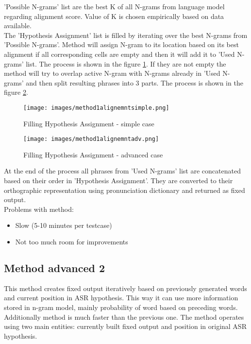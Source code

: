 \documentclass[a4paper,11pt,twoside]{report}
\theoremstyle{definition}
\begin{document}
'Possible N-grams' list are the best K of all N-grams from language model regarding alignment score. Value of K is chosen empirically based on data available.\\
The 'Hypothesis Assignment' list is filled by iterating over the best N-grams from 'Possible N-grams'. Method will assign N-gram to its location based on its best alignment if all corresponding cells are empty and then it will add it to 'Used N-grams' list. The process is shown in the figure \ref{img:method1alignemntsimple}. If they are not empty the method will try to overlap active N-gram with N-grams already in 'Used N-grams' and then split resulting phrases into 3 parts. The process is shown in the figure \ref{img:method1alignemntadv}.

\begin{figure}[H]{}
    \centering
    \texttt{[image: images/method1alignemntsimple.png]}
    \caption{Filling Hypothesis Assignment - simple case}
    \label{img:method1alignemntsimple}
\end{figure}

\begin{figure}[H]{}
    \centering
    \texttt{[image: images/method1alignemntadv.png]}
    \caption{Filling Hypothesis Assignment - advanced case}
    \label{img:method1alignemntadv}
\end{figure}

At the end of the process all phrases from 'Used N-grams' list are concatenated based on their order in 'Hypothesis Assignment'. They are converted to their orthographic representation using pronunciation dictionary and returned as fixed output.\\

Problems with method:
\begin{itemize}
    \item Slow (5-10 minutes per testcase)
    \item Not too much room for improvements
\end{itemize}

\subsection{Method advanced 2} \label{sec:met2}

This method creates fixed output iteratively based on previously generated words and current position in ASR hypothesis. This way it can use more information stored in n-gram model, mainly probability of word based on preceding words. Additionally method is much faster than the previous one. The method operates using two main entities: currently built fixed output and position in original ASR hypothesis.\\
\end{document}
